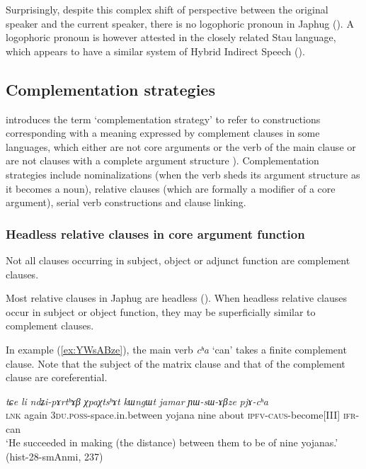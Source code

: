 \documentclass[oneside,a4paper,11pt]{article}
\newcommand{\ipa}[1]{\textit{\phon#1}}
\newcommand{\jpg}[2]{\ipa{#1} `#2'}
\begin{document}
Surprisingly, despite this complex shift of perspective between the original speaker and the current speaker, there is no logophoric pronoun in Japhug (\citealt{hagege74logophoriques, nikitina12logophoric}). A logophoric pronoun is however attested in the closely related Stau language, which appears to have a similar system of Hybrid Indirect Speech (\citealt{jacques16stau}).

 \subsection{Complementation strategies}  
  \label{sec:strategies}

\citet{dixon06complementation} introduces the term `complementation strategy' to refer to constructions corresponding with a meaning expressed by complement clauses in some languages, which either are not core arguments or the verb of the main clause or are not clauses with a complete argument structure \citealt[34-40]{dixon06complementation}). Complementation strategies include nominalizations (when the verb sheds its argument structure as it becomes a noun), relative clauses (which are formally a modifier of a core argument), serial verb constructions and clause linking.

  \subsubsection{Headless relative clauses in core argument function}   \label{sec:relative}
Not all clauses occurring in subject, object or adjunct function are complement clauses. 

Most relative clauses in Japhug are headless  (\citealt{jacques16relatives}). When headless relative clauses occur in subject or object function, they may be superficially similar to complement clauses.

In example (\ref{ex:YWsABze}), the main verb \jpg{cʰa}{can} takes a finite complement clause. Note that the subject of the matrix clause and that of the complement clause are coreferential.

\begin{exe}
\ex \label{ex:YWsABze}
\gll \ipa{tɕe} 	\ipa{li} 	\ipa{ndʑi-pɤrtʰɤβ} 	\ipa{χpaχtsʰɤt} 	\ipa{kɯngɯt} 	\ipa{jamar} 	\ipa{ɲɯ-sɯ-ɤβze} 	\ipa{pjɤ-cʰa}  \\
\textsc{lnk} again \textsc{3du.poss}-space.in.between yojana nine about \textsc{ipfv-caus}-become[III] \textsc{ifr}-can \\
\glt `He succeeded in making (the distance) between them to be of nine yojanas.' (hist-28-smAnmi, 237)
\end{exe}
\end{document}
